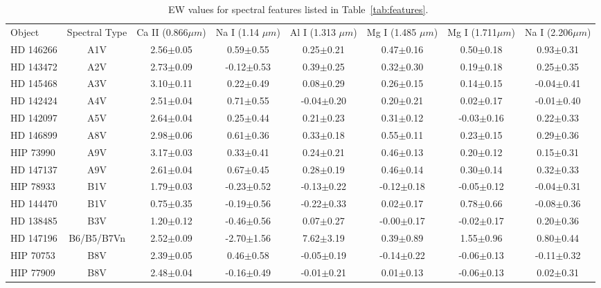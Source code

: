 \begin{table}
\begin{center}
\caption{EW values for spectral features listed in Table~\ref{tab:features}.~\label{tab:EWvals}}
\begin{tabular}{l|c|c|c|c|c|c|c}
Object & Spectral Type & Ca II (0.866$\mu m$) & Na I (1.14 $\mu m$) & Al I (1.313 $\mu m$) & Mg I (1.485 $\mu m$) & Mg I (1.711$\mu m$) & Na I (2.206$\mu m$) \\
HD 146266 & A1V & 2.56$\pm$0.05 & 0.59$\pm$0.55 & 0.25$\pm$0.21 & 0.47$\pm$0.16 & 0.50$\pm$0.18 & 0.93$\pm$0.31 \\
HD 143472 & A2V & 2.73$\pm$0.09 & -0.12$\pm$0.53 & 0.39$\pm$0.25 & 0.32$\pm$0.30 & 0.19$\pm$0.18 & 0.25$\pm$0.35 \\
HD 145468 & A3V & 3.10$\pm$0.11 & 0.22$\pm$0.49 & 0.08$\pm$0.29 & 0.26$\pm$0.15 & 0.14$\pm$0.15 & -0.04$\pm$0.41 \\
HD 142424 & A4V & 2.51$\pm$0.04 & 0.71$\pm$0.55 & -0.04$\pm$0.20 & 0.20$\pm$0.21 & 0.02$\pm$0.17 & -0.01$\pm$0.40 \\
HD 142097 & A5V & 2.64$\pm$0.04 & 0.25$\pm$0.44 & 0.21$\pm$0.23 & 0.31$\pm$0.12 & -0.03$\pm$0.16 & 0.22$\pm$0.33 \\
HD 146899 & A8V & 2.98$\pm$0.06 & 0.61$\pm$0.36 & 0.33$\pm$0.18 & 0.55$\pm$0.11 & 0.23$\pm$0.15 & 0.29$\pm$0.36 \\
HIP 73990 & A9V & 3.17$\pm$0.03 & 0.33$\pm$0.41 & 0.24$\pm$0.21 & 0.46$\pm$0.13 & 0.20$\pm$0.12 & 0.15$\pm$0.31 \\
HD 147137 & A9V & 2.61$\pm$0.04 & 0.67$\pm$0.45 & 0.28$\pm$0.19 & 0.46$\pm$0.14 & 0.30$\pm$0.14 & 0.32$\pm$0.33 \\
HIP 78933 & B1V & 1.79$\pm$0.03 & -0.23$\pm$0.52 & -0.13$\pm$0.22 & -0.12$\pm$0.18 & -0.05$\pm$0.12 & -0.04$\pm$0.31 \\
HD 144470 & B1V & 0.75$\pm$0.35 & -0.19$\pm$0.56 & -0.22$\pm$0.33 & 0.02$\pm$0.17 & 0.78$\pm$0.66 & -0.08$\pm$0.36 \\
HD 138485 & B3V & 1.20$\pm$0.12 & -0.46$\pm$0.56 & 0.07$\pm$0.27 & -0.00$\pm$0.17 & -0.02$\pm$0.17 & 0.20$\pm$0.36 \\
HD 147196 & B6/B5/B7Vn & 2.52$\pm$0.09 & -2.70$\pm$1.56 & 7.62$\pm$3.19 & 0.39$\pm$0.89 & 1.55$\pm$0.96 & 0.80$\pm$0.44 \\
HIP 70753 & B8V & 2.39$\pm$0.05 & 0.46$\pm$0.58 & -0.05$\pm$0.19 & -0.14$\pm$0.22 & -0.06$\pm$0.13 & -0.11$\pm$0.32 \\
HIP 77909 & B8V & 2.48$\pm$0.04 & -0.16$\pm$0.49 & -0.01$\pm$0.21 & 0.01$\pm$0.13 & -0.06$\pm$0.13 & 0.02$\pm$0.31 \\

\end{tabular}
\end{center}
\end{table}
